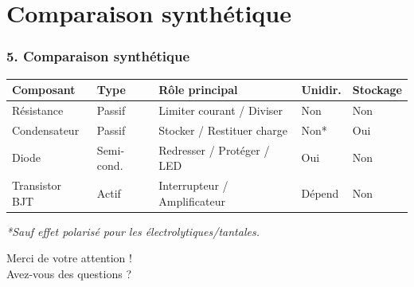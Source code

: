 \documentclass[11pt]{beamer}
\begin{document}
\section{Comparaison synthétique}
\begin{frame}
    \frametitle{5. Comparaison synthétique}
    \footnotesize
    \begin{table}[]
        \begin{tabular}{@{}lllll@{}}
        \toprule
        \textbf{Composant} & \textbf{Type} & \textbf{Rôle principal} & \textbf{Unidir.} & \textbf{Stockage} \\ \midrule
        Résistance & Passif & Limiter courant / Diviser & Non & Non \\
        Condensateur & Passif & Stocker / Restituer charge & Non* & Oui \\
        Diode & Semi-cond. & Redresser / Protéger / LED & Oui & Non \\
        Transistor BJT & Actif & Interrupteur / Amplificateur & Dépend & Non \\ \bottomrule
        \end{tabular}
    \end{table}
    \vspace{0.5cm}
    \textit{*Sauf effet polarisé pour les électrolytiques/tantales.}
\end{frame}

\appendix
\begin{frame}[noframenumbering]
    \begin{center}
        {\LARGE Merci de votre attention !\\Avez-vous des questions ?}
    \end{center}
\end{frame}
\end{document}
